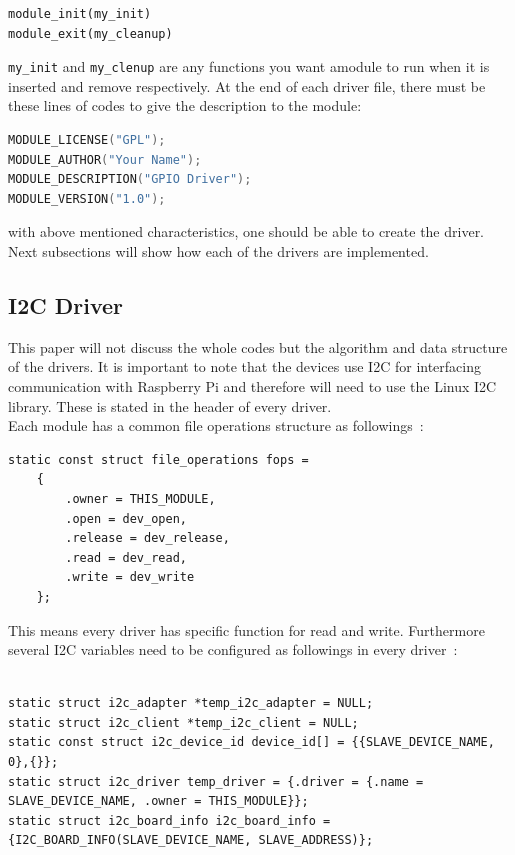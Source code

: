 \begin{verbatim}
module_init(my_init)
module_exit(my_cleanup)
\end{verbatim}

\verb'my_init' and \verb'my_clenup' are any functions you want amodule to run when it is inserted and remove respectively. At the end of each driver file, there must be these lines of codes to give the description to the module:

\begin{lstlisting}[language=C]
MODULE_LICENSE("GPL");
MODULE_AUTHOR("Your Name");
MODULE_DESCRIPTION("GPIO Driver");
MODULE_VERSION("1.0");
\end{lstlisting}

with above mentioned characteristics, one should be able to create the driver. Next subsections will show how each of the drivers are implemented.

\subsection{I2C Driver}
This paper will not discuss the whole codes but the algorithm and data structure of the drivers. It is important to note that the devices use I2C for interfacing communication with Raspberry Pi and therefore will need to use the Linux I2C library. These is stated in the header of every driver.\\
Each module has a common file operations structure as followings~\cite{noauthor_character_nodate}:

\begin{lstlisting}
static const struct file_operations fops =
    {
        .owner = THIS_MODULE,
        .open = dev_open,
        .release = dev_release,
        .read = dev_read,
        .write = dev_write
	};
\end{lstlisting}

This means every driver has specific function for read and write. Furthermore several I2C variables need to be configured as followings in every driver~\cite{noauthor_character_nodate}:

\begin{lstlisting}

static struct i2c_adapter *temp_i2c_adapter = NULL;
static struct i2c_client *temp_i2c_client = NULL;
static const struct i2c_device_id device_id[] = {{SLAVE_DEVICE_NAME, 0},{}};
static struct i2c_driver temp_driver = {.driver = {.name = SLAVE_DEVICE_NAME, .owner = THIS_MODULE}};
static struct i2c_board_info i2c_board_info = {I2C_BOARD_INFO(SLAVE_DEVICE_NAME, SLAVE_ADDRESS)};

\end{lstlisting}

